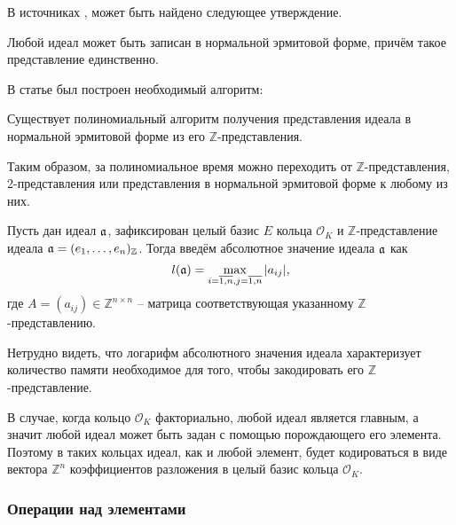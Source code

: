 \documentclass[_00_dissertation.tex]{subfiles}
\begin{document}
В источниках \cite{Cohen}, \cite{Post} может быть найдено следующее утверждение.

\begin{statement}
    Любой идеал может быть записан в нормальной эрмитовой форме, причём такое представление единственно.
\end{statement}

В статье \cite{PolynomialHermitForm} был построен необходимый алгоритм:

\begin{statement}
    Существует полиномиальный алгоритм получения представления идеала в нормальной эрмитовой форме из его $\mathbb{Z}$-представления.
\end{statement}

\begin{corollary}
    Таким образом, за полиномиальное время можно переходить от $\mathbb{Z}$-представления, 2-представления или представления в нормальной эрмитовой форме к любому из них.
\end{corollary}

\begin{definition}
    Пусть дан идеал $\mathfrak{a}$, зафиксирован целый базис $E$ кольца $\mathcal{O}_K$ и $\mathbb{Z}$-представление идеала $\mathfrak{a} = (e_1,\dots,e_n)_{\mathbb{Z}}$. Тогда введём абсолютное значение идеала $\mathfrak{a}$ как
    \begin{equation}
        l(\mathfrak{a}) = \max\limits_{i = \overline{1,n}, j = \overline{1,n}} |a_{ij}|, 
    \end{equation}
    где $A = (a_{ij}) \in \mathbb{Z}^{n \times n}$ -- матрица соответствующая указанному $\mathbb{Z}$-представлению.
\end{definition}

Нетрудно видеть, что логарифм абсолютного значения идеала характеризует количество памяти необходимое для того, чтобы закодировать его $\mathbb{Z}$-представление.

В случае, когда кольцо $\mathcal{O}_K$ факториально, любой идеал является главным, а значит любой идеал может быть задан с помощью порождающего его элемента. Поэтому в таких кольцах идеал, как и любой элемент, будет кодироваться в виде вектора $\mathbb{Z}^n$ коэффициентов разложения в целый базис кольца $\mathcal{O}_K$.

\subsubsection{Операции над элементами}
\end{document}
